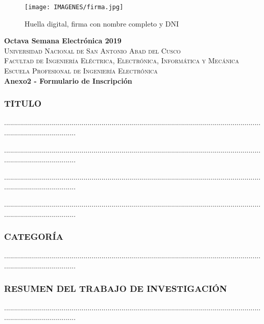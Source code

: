 \documentclass{article}
\begin{document}
\begin{figure}[hbtp]
\centering
\texttt{[image: IMAGENES/firma.jpg]}
\caption{Huella digital, firma con nombre completo y DNI}
\end{figure}

\newpage
{\center
{\Huge \bfseries Octava Semana Electrónica 2019} \\ [0.4cm]
\textsc{\LARGE  Universidad Nacional de San Antonio Abad del Cusco}\\[0.4cm] 
\textsc{\Large Facultad de Ingeniería Eléctrica, Electrónica, Informática y Mecánica}\\[0.4cm] 
\textsc{\large Escuela Profesional de Ingeniería Electrónica}\\[0.4cm]
{ \bfseries Anexo2 - Formulario de Inscripción}}

\subsubsection{TITULO}

.....................................................................................................................................................................

.....................................................................................................................................................................

.....................................................................................................................................................................

.....................................................................................................................................................................


\subsubsection{CATEGORÍA}

.....................................................................................................................................................................

\subsubsection{RESUMEN DEL TRABAJO DE INVESTIGACIÓN}

.....................................................................................................................................................................
\end{document}
